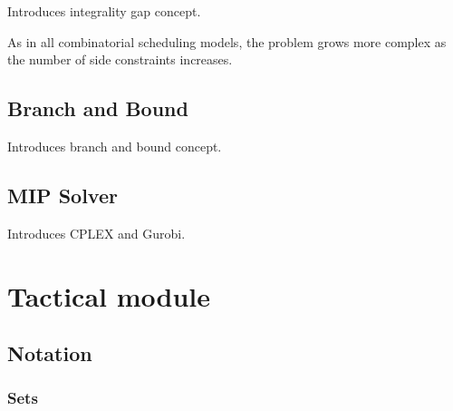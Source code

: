 Introduces integrality gap concept.

As in all combinatorial scheduling models, the problem grows more complex as the number of side constraints increases.


\subsection{Branch and Bound}

Introduces branch and bound concept.


\subsection{MIP Solver}

Introduces CPLEX and Gurobi.




\section{Tactical module}


\subsection{Notation}

\subsubsection{Sets}

